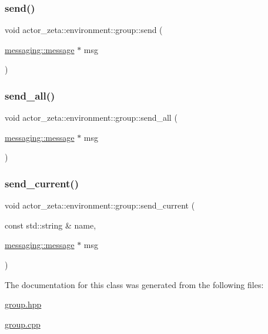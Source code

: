 \subsubsection{\texorpdfstring{send()}{send()}}
{\footnotesize\ttfamily void actor\+\_\+zeta\+::environment\+::group\+::send (\begin{DoxyParamCaption}\item[{\hyperlink{classactor__zeta_1_1messaging_1_1message}{messaging\+::message} $\ast$}]{msg }\end{DoxyParamCaption})}

\mbox{\label{classactor__zeta_1_1environment_1_1group_a93cd83622786c6436fd66f016f8acf22}} 
\subsubsection{\texorpdfstring{send\+\_\+all()}{send\_all()}}
{\footnotesize\ttfamily void actor\+\_\+zeta\+::environment\+::group\+::send\+\_\+all (\begin{DoxyParamCaption}\item[{\hyperlink{classactor__zeta_1_1messaging_1_1message}{messaging\+::message} $\ast$}]{msg }\end{DoxyParamCaption})}

\mbox{\label{classactor__zeta_1_1environment_1_1group_aa8ae92ceb3d037ed12c025fd4f1b7263}} 
\subsubsection{\texorpdfstring{send\+\_\+current()}{send\_current()}}
{\footnotesize\ttfamily void actor\+\_\+zeta\+::environment\+::group\+::send\+\_\+current (\begin{DoxyParamCaption}\item[{const std\+::string \&}]{name,  }\item[{\hyperlink{classactor__zeta_1_1messaging_1_1message}{messaging\+::message} $\ast$}]{msg }\end{DoxyParamCaption})}



The documentation for this class was generated from the following files\+:\begin{DoxyCompactItemize}
\item 
\hyperlink{group_8hpp}{group.\+hpp}\item 
\hyperlink{group_8cpp}{group.\+cpp}\end{DoxyCompactItemize}
